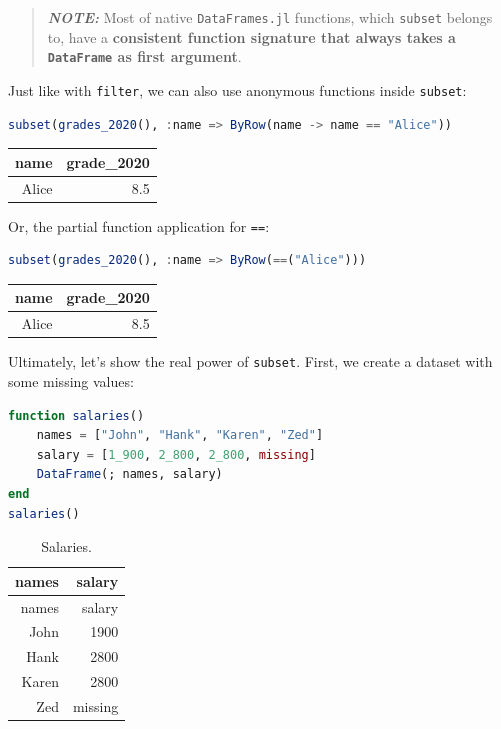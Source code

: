 \documentclass[
  notoc %
]{tufte-book}
\newcommand{\passthrough}[1]{#1}
\begin{document}
\begin{quote}
\textbf{\emph{NOTE:}} Most of native
\passthrough{\lstinline!DataFrames.jl!} functions, which
\passthrough{\lstinline!subset!} belongs to, have a \textbf{consistent
function signature that always takes a
\passthrough{\lstinline!DataFrame!} as first argument}.
\end{quote}

Just like with \passthrough{\lstinline!filter!}, we can also use
anonymous functions inside \passthrough{\lstinline!subset!}:

\begin{lstlisting}[language=Julia]
subset(grades_2020(), :name => ByRow(name -> name == "Alice"))
\end{lstlisting}

\begin{longtable}[]{@{}rr@{}}
\toprule
name & grade\_2020 \\
\midrule
\endhead
Alice & 8.5 \\
\bottomrule
\end{longtable}

Or, the partial function application for \passthrough{\lstinline!==!}:

\begin{lstlisting}[language=Julia]
subset(grades_2020(), :name => ByRow(==("Alice")))
\end{lstlisting}

\begin{longtable}[]{@{}rr@{}}
\toprule
name & grade\_2020 \\
\midrule
\endhead
Alice & 8.5 \\
\bottomrule
\end{longtable}

Ultimately, let's show the real power of
\passthrough{\lstinline!subset!}. First, we create a dataset with some
missing values:

\begin{lstlisting}[language=Julia]
function salaries()
    names = ["John", "Hank", "Karen", "Zed"]
    salary = [1_900, 2_800, 2_800, missing]
    DataFrame(; names, salary)
end
salaries()
\end{lstlisting}

\hypertarget{tbl:salaries}{}
\begin{longtable}[]{@{}rr@{}}
\caption{\label{tbl:salaries}Salaries.}\tabularnewline
\toprule
names & salary \\
\midrule
\endfirsthead
\toprule
names & salary \\
\midrule
\endhead
John & 1900 \\
Hank & 2800 \\
Karen & 2800 \\
Zed & missing \\
\bottomrule
\end{longtable}
\end{document}
